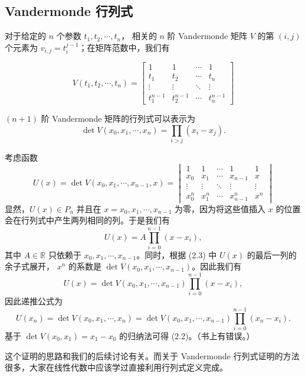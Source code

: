 \documentclass[a4paper]{ctexart}
\begin{document}
\subsection{Vandermonde 行列式}

 对于给定的 $n$ 个参数 $t_1, t_2, \cdots, t_n$，
相关的 $n$ 阶 Vandermonde 矩阵 $V$ 的第 $(i, j)$ 个元素为 $v_{i,j} = t_{i}^{j-1}$；在矩阵范数中，我们有

\[
V (t_1 , t_2 , \cdots , t_n ) = \begin{bmatrix}
 1 & 1 & \cdots & 1 \\
 t_1 & t_2 & \cdots & t_n \\
 \vdots & \vdots & \ddots & \vdots \\
 t_1^{n-1} & t_2^{n-1} & \cdots & t_n^{n-1}
\end{bmatrix} \tag{2.1}
\]

 $(n + 1)$ 阶 Vandermonde 矩阵的行列式可以表示为
\[
\det V (x_0 , x_1 , \cdots , x_n ) = \prod_{i>j} (x_i - x_j). \tag{2.2}
\]

 考虑函数
\[
U (x) = \det V (x_0, x_1, \cdots , x_{n-1} , x) = \begin{vmatrix}
 1 & 1 & \cdots & 1 & 1 \\
 x_0 & x_1 & \cdots & x_{n-1} & x \\
 \vdots & \vdots & \ddots & \vdots & \vdots \\
 x_0^n & x_1^n & \cdots & x_{n-1}^n & x^n
\end{vmatrix} \tag{2.3}
\]
显然，$U (x) \in P_n$ 并且在 $x = x_0 , x_1 , \cdots , x_{n-1}$ 为零，因为将这些值插入 $x$ 的位置会在行列式中产生两列相同的列。于是我们有
\[
U (x) = A \prod_{i=0}^{n-1} (x - x_i),
\]
其中 $A \in \mathbb{R}$ 只依赖于 $x_0 , x_1 , \cdots , x_{n-1}$。同时，根据 (2.3) 中 $U (x)$ 的最后一列的余子式展开，
$x^n$ 的系数是 $\det V (x_0 , x_1 , \cdots , x_{n-1})$。因此我们有
\[
U (x) = \det V (x_0, x_1 , \cdots , x_{n-1}) \prod_{i=0}^{n-1} (x - x_i),
\]
因此递推公式为
\[
U(x_n) = \det V (x_0 , x_1 , \cdots , x_n) = \det V (x_0 , x_1 , \cdots , x_{n-1}) \prod_{i=0}^{n-1} (x_n - x_i).
\]
基于 $\det V(x_0, x_1) = x_1 - x_0$ 的归纳法可得 (2.2)。（书上有错误。）

这个证明的思路和我们的后续讨论有关。而关于 Vandermonde 行列式证明的方法很多，大家在线性代数中应该学过直接利用行列式定义完成。

\end{document}
